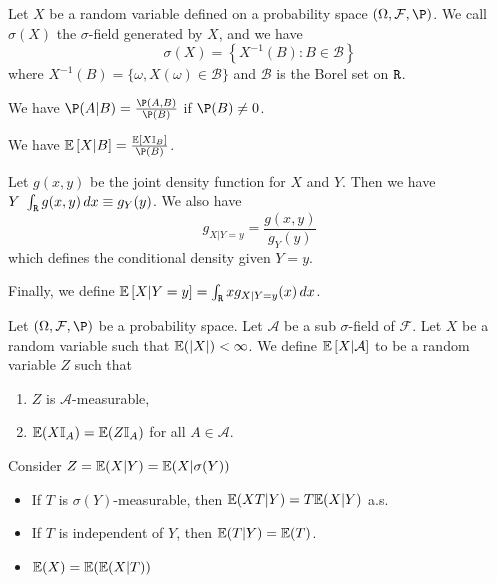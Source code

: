 \documentclass[a4 paper]{article}
\begin{document}
\begin{defn}
    Let $X$ be a random variable defined on a probability space $(\Omega, \mathcal{F}, \P)$.  We call $\sigma(X)$ the $\sigma$-field generated by $X$, and we have \[
        \sigma(X) = \left\{ X^{-1}(B): B \in \mathcal{B} \right\}
    \] where $X^{-1}(B) = \{ \omega, X(\omega) \in \mathcal{B} \}$ and $\mathcal{B}$ is the Borel set on $\texttt{R}$.
\end{defn}

\begin{defn}
    We have $\P( A | B) = \frac{\P(A, B)}{\P(B)}$ if $\P(B) \neq 0$.
\end{defn}

\begin{defn}
    We have $\expc{X | B} = \frac{ \expc{ X \mathbb{I}_B}}{\P(B)}$.
\end{defn}

\begin{defn}
    Let $g(x,y)$ be the joint density function for $X$ and $Y$.  Then we have $Y ~ \int_\texttt{R} g(x,y)\, dx \equiv g_Y(y)$.  We also have \[
        g_{X|Y = y} = \frac{g(x,y)}{g_Y(y)}
    \] which defines the conditional density given $Y = y$.
    
    Finally, we define $\mathbb{E}\left[ X |Y = y\right] = \int_\texttt{R} x g_{X|Y = y}(x) \,dx$.
\end{defn}

\begin{defn}
    Let $(\Omega, \mathcal{F}, \P)$ be a probability space.  Let $\mathcal{A}$ be a sub $\sigma$-field of $\mathcal{F}$.  Let $X$ be a random variable such that $\mathbb{E}(|X|) < \infty$.  We define $\mathbb{E}\left[X | \mathcal{A}\right]$ to be a random variable $Z$ such that 
    \begin{enumerate}
        \item $Z$ is $\mathcal{A}$-measurable,
        \item $\mathbb{E}(X\mathbb{I}_A) = \mathbb{E}(Z\mathbb{I}_A)$ for all $A \in \mathcal{A}$.
    \end{enumerate}
\end{defn}


\begin{prop}
    Consider $Z = \mathbb{E}(X|Y) = \mathbb{E}(X|\sigma(Y))$
    \begin{itemize}
        \item If $T$ is $\sigma(Y)$-measurable, then $\mathbb{E}(XT|Y) = T\mathbb{E}(X|Y)$ a.s.
        \item If $T$ is independent of $Y$, then $\mathbb{E}(T|Y) = \mathbb{E}(T)$.
        \item $\mathbb{E}(X) = \mathbb{E}(\mathbb{E}(X|T))$
    \end{itemize}
\end{prop}
\end{document}

